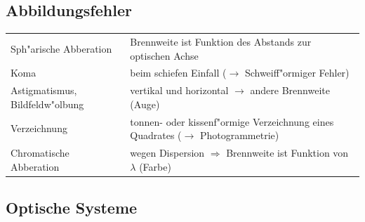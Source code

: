 \subsection{Abbildungsfehler}
\begin{tabular}{ll}
  Sph"arische Abberation & Brennweite ist Funktion des Abstands zur optischen
  Achse \\
  Koma & beim schiefen Einfall ($\rightarrow$ Schweiff"ormiger Fehler) \\
  Astigmatismus, Bildfeldw"olbung & vertikal und horizontal $\rightarrow$ andere
  Brennweite (Auge) \\
  Verzeichnung & tonnen- oder kissenf"ormige Verzeichnung eines Quadrates
  ($\rightarrow$ Photogrammetrie) \\
  Chromatische Abberation & wegen Dispersion $\Rightarrow$ Brennweite ist
  Funktion von $\lambda$ (Farbe) \\
\end{tabular}

\subsection{Optische Systeme}
